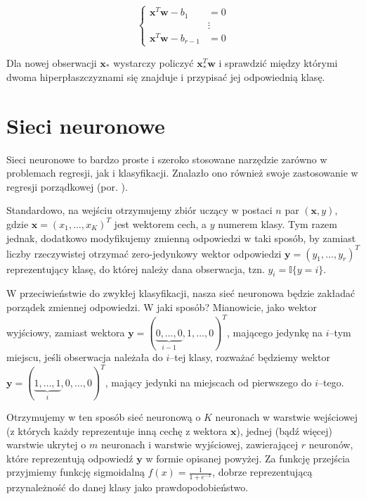 \documentclass{mini}
\begin{document}
$$\begin{cases}
\textbf{x}^T\textbf{w}-b_1 &=0\\
&\vdots \\
\textbf{x}^T\textbf{w}-b_{r-1} &=0
\end{cases}
$$

Dla nowej obserwacji $\textbf{x}_\ast$ wystarczy policzyć $\textbf{x}_\ast^T\textbf{w}$ i sprawdzić między którymi dwoma hiperpłaszczyznami się znajduje i przypisać jej odpowiednią klasę.

\section{Sieci neuronowe}
 
Sieci neuronowe to bardzo proste i szeroko stosowane narzędzie zarówno w problemach regresji, jak i klasyfikacji. Znalazło ono również swoje zastosowanie w regresji porządkowej (por. \cite{nna}). 

Standardowo, na wejściu otrzymujemy zbiór uczący w postaci $n$ par $(\textbf{x},y)$, gdzie $\textbf{x} = (x_1, \ldots, x_K)^T$ jest wektorem cech, a $y$ numerem klasy. Tym razem jednak, dodatkowo modyfikujemy zmienną odpowiedzi w taki sposób, by zamiast liczby rzeczywistej otrzymać zero-jedynkowy wektor odpowiedzi $\textbf{y} = (y_1, \ldots, y_r)^T$ reprezentujący klasę, do której należy dana obserwacja, tzn. $y_i = \mathbb{I}\lbrace y =i \rbrace$.

W przeciwieństwie do zwykłej klasyfikacji, nasza sieć neuronowa będzie zakładać porządek zmiennej odpowiedzi. W jaki sposób? Mianowicie, jako wektor wyjściowy, zamiast wektora $\textbf{y} = (\underbrace{0, \ldots, 0}_{i-1}, 1, \ldots, 0)^T$, mającego jedynkę na $i$--tym miejscu, jeśli obserwacja należała do $i$--tej klasy, rozważać będziemy wektor $\textbf{y} = (\underbrace{1, \ldots, 1}_{i}, 0, \ldots, 0)^T$, mający jedynki na miejscach od pierwszego do $i$--tego.

Otrzymujemy w ten sposób sieć neuronową o $K$ neuronach w warstwie wejściowej (z których każdy reprezentuje inną cechę z wektora $\textbf{x}$), jednej (bądź więcej) warstwie ukrytej o $m$ neuronach i warstwie wyjściowej, zawierającej $r$ neuronów, które reprezentują odpowiedź $\textbf{y}$ w formie opisanej powyżej. Za funkcję przejścia przyjmiemy funkcję sigmoidalną $f(x) = \frac{1}{1+e^{-x}}$, dobrze reprezentującą przynależność do danej klasy jako prawdopodobieństwo. 
\end{document}
